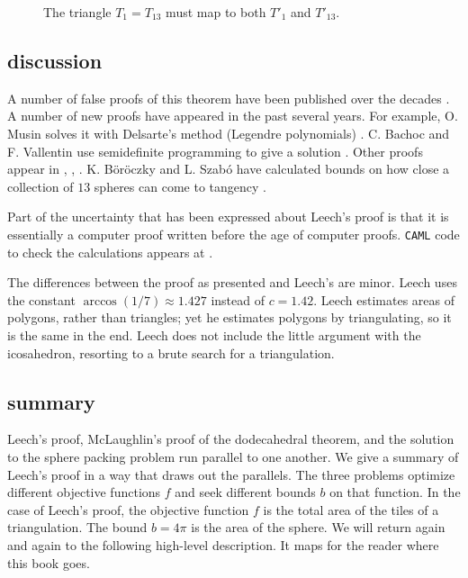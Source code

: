 \begin{figure}[htb]
  \centering
  \caption{The triangle $T_1=T_{13}$ must map to both $T'_1$ and $T'_{13}$.}
  \label{fig:th:D}
\end{figure}


\subsection{discussion}




A number of false proofs of this theorem have been published over the decades \cite{Hal94}.  
A number of new proofs have appeared in the past several years.  
For example, O. Musin solves it
with Delsarte's method (Legendre polynomials) \cite{Mus06}.  C. Bachoc and F. Vallentin use semidefinite
programming to give a solution \cite{BV06}.  
Other proofs appear in 
\cite{Mae01}, \cite{Ans02},  \cite{Bor03}.   K. B\"or\"oczky and L. Szab\'o have calculated
bounds on how close a collection of $13$ spheres can come to tangency \cite{BoSz03}.  

Part of the uncertainty that has been expressed about
Leech's proof is that it is essentially a computer proof written before
the age of computer proofs.  {\tt CAML} code  to check the
calculations appears at .  

The differences between the proof as presented and Leech's are minor.  Leech
uses the constant $\arccos(1/7)\approx 1.427$ instead of $c=1.42$.  Leech estimates
areas of polygons, rather than triangles; yet he estimates polygons by triangulating,
so it is the same in the end.  Leech does not include the little argument with
the icosahedron,  resorting to a brute search for a triangulation.

\subsection{summary}\label{sec:summary}

 Leech's proof, McLaughlin's proof of the dodecahedral theorem, and
the solution to the sphere packing problem run parallel to one another.
We give a summary of Leech's proof in a way that draws out the parallels.
The three problems optimize different objective functions $f$ and seek different
bounds $b$ on that function. In the case of Leech's proof, the objective
function $f$ is the total 
area of the tiles of a triangulation.  The bound $b=4\pi$ is the area of
the sphere.  We will return again and again to the following high-level description.  It maps for the reader where this book goes.

